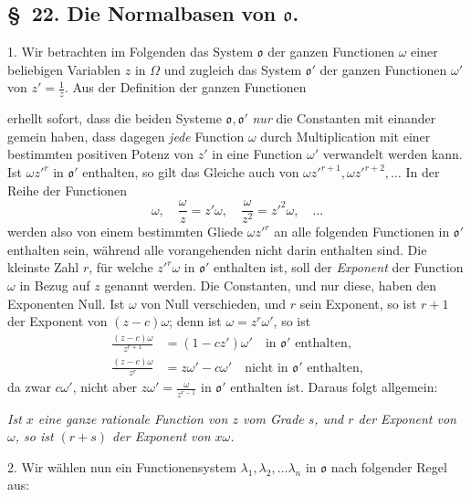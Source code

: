 \documentclass{article}
\begin{document}
\subsection*{§~22. Die Normalbasen von $\mathfrak{o}$.}

1. Wir betrachten im Folgenden das System $\mathfrak{o}$ der ganzen Functionen $\omega$ einer beliebigen Variablen $z$ in $\Omega$ und zugleich das System $\mathfrak{o}'$ der ganzen Functionen $\omega'$ von $z' = \frac{1}{z}$. Aus der Definition der ganzen Functionen

erhellt sofort, dass die beiden Systeme $\mathfrak{o}, \mathfrak{o}'$ \emph{nur} die Constanten mit einander gemein haben, dass dagegen \emph{jede} Function $\omega$ durch Multiplication mit einer bestimmten positiven Potenz von $z'$ in eine Function $\omega'$ verwandelt werden kann. Ist $\omega z'^{r}$ in $\mathfrak{o}'$ enthalten, so gilt das Gleiche auch von $\omega z'^{r+1}, \omega z'^{r+2}, \ldots$ In der Reihe der Functionen
\[ \omega, \quad \frac{\omega}{z} = z'\omega, \quad \frac{\omega}{z^{2}} = z'^{2}\omega, \quad \ldots \]
werden also von einem bestimmten Gliede $\omega z'^{r}$ an alle folgenden Functionen in $\mathfrak{o}'$ enthalten sein, während alle vorangehenden nicht darin enthalten sind. Die kleinste Zahl $r$, für welche $z'^{r}\omega$ in $\mathfrak{o}'$ enthalten ist, soll der \emph{Exponent} der Function $\omega$ in Bezug auf $z$ genannt werden. Die Constanten, und nur diese, haben den Exponenten Null. Ist $\omega$ von Null verschieden, und $r$ sein Exponent, so ist $r+1$ der Exponent von $(z-c)\omega$; denn ist $\omega = z^{r}\omega'$, so ist
\[ \begin{aligned} \frac{(z-c)\omega}{z^{r+1}} &= (1-cz')\omega' \quad \text{in } \mathfrak{o}' \text{ enthalten,} \\ \frac{(z-c)\omega}{z^{r}} &= z\omega' - c\omega' \quad \text{nicht in } \mathfrak{o}' \text{ enthalten,} \end{aligned} \]
da zwar $c\omega'$, nicht aber $z\omega' = \frac{\omega}{z^{r-1}}$ in $\mathfrak{o}'$ enthalten ist. Daraus folgt allgemein:

\emph{Ist $x$ eine ganze rationale Function von $z$ vom Grade $s$, und $r$ der Exponent von $\omega$, so ist $(r+s)$ der Exponent von $x\omega$.}

2. Wir wählen nun ein Functionensystem $\lambda_{1}, \lambda_{2}, \ldots \lambda_{n}$ in $\mathfrak{o}$ nach folgender Regel aus:
\end{document}
